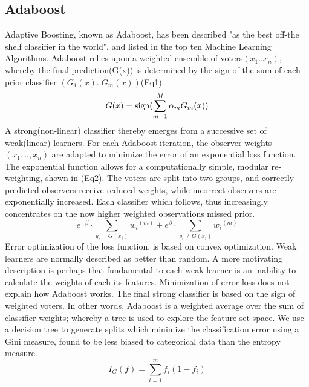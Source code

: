 \documentclass[12pt]{article}
\begin{document}
\subsection*{Adaboost}
  Adaptive Boosting, known as Adaboost, has been described "as the best off-the shelf classifier in the world"\cite{elemStatLearn}, and listed in the top ten Machine Learning Algorithms.  Adaboost relies upon a weighted ensemble of voters$(x_1..x_n)$, whereby the final prediction(G(x)) is determined by the sign of the sum of each prior classifier $(G_1(x)..G_m(x))$(Eq1).
\begin{equation}
G(x)=\textup{sign}(\sum_{m=1}^{M}\alpha_{m}G_{m}(x) )
\end{equation}
A strong(non-linear) classifier thereby emerges from a successive set of weak(linear) learners.  For each Adaboost iteration, the observer weights$(x_1,..,x_n)$ are adapted to minimize the error of an exponential loss function.  The exponential function allows for a computationally simple, modular re-weighting, shown in (Eq2).  The voters are split into two groups, and correctly predicted observers receive reduced weights, while incorrect observers are exponentially increased.  Each classifier which follows, thus increasingly concentrates on the now higher weighted observations missed prior.  
\begin{equation}
e^{-\beta }\cdot\sum_{y_{i}=G(x_{i})}{w_{i}}^{(m)} + e^{\beta }\cdot\sum_{y_{i}\neq G(x_{i})}{w_{i}}^{(m)}
\end{equation}
   Error optimization of the loss function, is based on convex optimization.  Weak learners are normally described as better than random.  A more motivating description is perhaps that fundamental to each weak learner is an inability to calculate the weights of each its features.  Minimization of error loss does not explain how Adaboost works.  The final strong classifier is based on the sign of weighted voters.  In other words, Adaboost is a weighted average over the sum of classifier weights; whereby a tree is used to explore the feature set space.  We use a decision tree to generate splits which minimize the classification error using a Gini measure, found to be less biased to categorical data than the entropy measure.    
\begin{equation}
I_G(f)=\sum_{i=1}^{m}f_i(1-f_i)
\end{equation}
\end{document}
